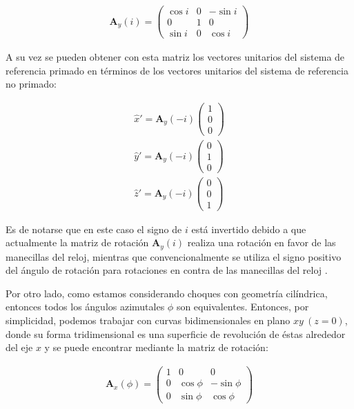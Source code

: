 \begin{align}
  \mathbf{A}_y(i) = \left(
  \begin{array}{ccc}
    \cos i & 0 & -\sin i \\
    0      & 1 & 0       \\
    \sin i & 0 & \cos i
  \end{array}\right)
\end{align}

A su vez se pueden obtener con esta matriz los vectores unitarios del sistema de referencia primado en términos de los vectores unitarios del sistema de referencia no primado:

\begin{align}
  \hat{x}' = \mathbf{A}_y(-i)\left(
  \begin{array}{c}
    1 \\ 0 \\ 0
  \end{array}\right)\\
  \hat{y}' = \mathbf{A}_y(-i)\left(
  \begin{array}{c}
    0 \\ 1 \\ 0
  \end{array} \right)\\
  \hat{z}' = \mathbf{A}_y(-i)\left(
  \begin{array}{c}
    0 \\ 0 \\ 1
  \end{array}\right) \label{eq:y-matrix}
\end{align}

Es de notarse que en este caso el signo de $i$ está invertido debido a que actualmente la matriz de rotación $\mathbf{A}_y(i)$ realiza una rotación en favor de las manecillas del reloj, mientras que convencionalmente se utiliza el signo positivo del ángulo de rotación para rotaciones en contra de las manecillas del reloj \citep{Bronson}.

Por otro lado, como estamos considerando choques con geometría cilíndrica, entonces todos los ángulos azimutales $\phi$ son equivalentes. Entonces, por simplicidad, podemos trabajar con curvas bidimensionales en plano $xy~(z=0)$, donde su forma tridimensional es una superficie de revolución de éstas alrededor del eje $x$ y se puede encontrar mediante la matriz de rotación:

\begin{align}
  \mathbf{A}_x(\phi) = \left(
  \begin{array}{ccc}
    1 & 0        & 0         \\
    0 & \cos\phi & -\sin\phi \\
    0 & \sin\phi & \cos\phi
  \end{array}
  \right) \label{eq:x-matrix}
\end{align}

